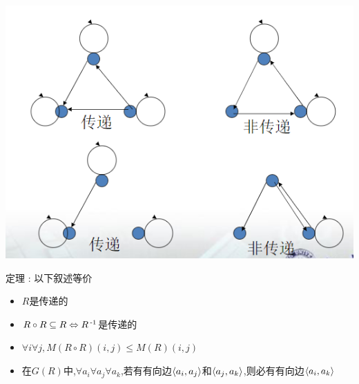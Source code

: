 {{{{\begin{itemize}
{            \begin{center}
              \includegraphics{resources/transivity.png}
            \end{center}

            定理 : 以下叙述等价
            \begin{itemize}
              \item $R$是传递的
              \item $R \circ R \subseteq R \Leftrightarrow R\operatorname{^{-1}}$是传递的
              \item $\forall i \forall j,M(R \circ R)(i,j) \leq M(R)(i,j)$
              \item 在$G(R)$中,$\forall a_i \forall a_j \forall a_k$,若有有向边$\langle a_i,a_j\rangle$和$\langle a_j,a_k\rangle$,则必有有向边$\langle a_i,a_k\rangle$
            \end{itemize}
            }
    \end{itemize}

}}}}
